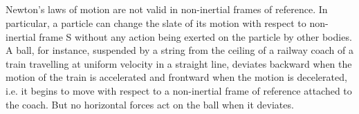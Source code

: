 \subsection{}\label{7.2.1} Newton's laws of motion are not valid in non-inertial frames of reference. In particular, a particle can change the slate of its motion with respect to non-inertial frame S without any action being exerted on the particle by other bodies. A ball, for instance, suspended by a string from the ceiling of a railway coach of a train travelling at uniform velocity in a straight line, deviates backward when the motion of the train is accel­erated and frontward when the motion is decelerated, i.e. it begins to move with respect to a non-inertial frame of reference attached to the coach. But no horizontal forces act on the ball when it deviates.

